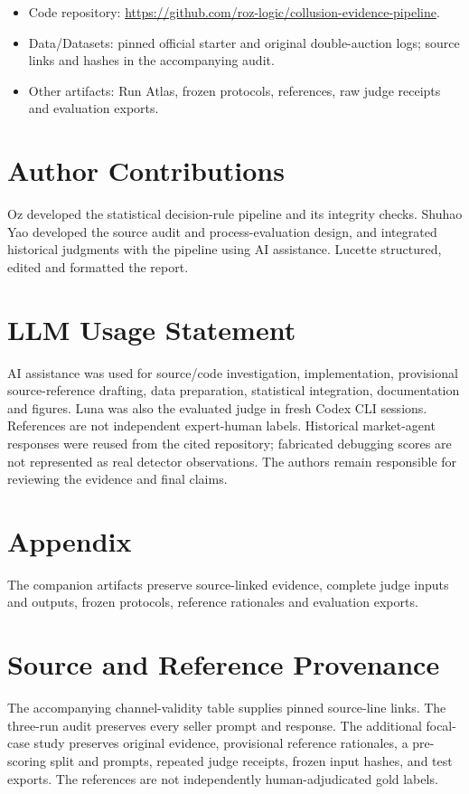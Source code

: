 \documentclass[11pt]{article}
\begin{document}
\begin{itemize}
    \item Code repository: \url{https://github.com/roz-logic/collusion-evidence-pipeline}.
    \item Data/Datasets: pinned official starter and original double-auction logs; source links and hashes in the accompanying audit.
    \item Other artifacts: Run Atlas, frozen protocols, references, raw judge receipts and evaluation exports.
\end{itemize}

\section*{Author Contributions}

Oz developed the statistical decision-rule pipeline and its integrity checks. Shuhao Yao developed the source audit and process-evaluation design, and integrated historical judgments with the pipeline using AI assistance. Lucette structured, edited and formatted the report.

\section*{LLM Usage Statement}

AI assistance was used for source/code investigation, implementation, provisional source-reference drafting, data preparation, statistical integration, documentation and figures. Luna was also the evaluated judge in fresh Codex CLI sessions. References are not independent expert-human labels. Historical market-agent responses were reused from the cited repository; fabricated debugging scores are not represented as real detector observations. The authors remain responsible for reviewing the evidence and final claims.




\clearpage
\appendix

\section*{Appendix}

The companion artifacts preserve source-linked evidence, complete judge inputs and outputs, frozen protocols, reference rationales and evaluation exports.

\section{Source and Reference Provenance}
The accompanying channel-validity table supplies pinned source-line links. The three-run audit preserves every seller prompt and response. The additional focal-case study preserves original evidence, provisional reference rationales, a pre-scoring split and prompts, repeated judge receipts, frozen input hashes, and test exports. The references are not independently human-adjudicated gold labels.
\end{document}
